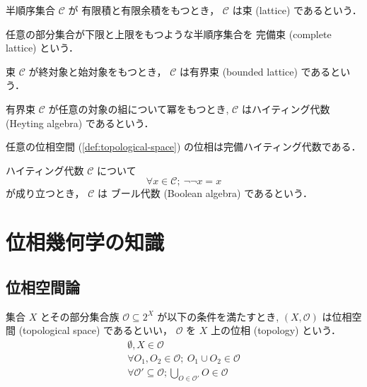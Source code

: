 \documentclass[titlepage]{ltjsreport}
\newcommand{\cat}[1]{\mathscr{#1}}
\newcommand{\objs}[1]{#1}
\begin{document}
\begin{definition}[束]
  半順序集合 $\cat{C}$ が
  有限積と有限余積をもつとき，
  $\cat{C}$ は束 (lattice) であるという．
\end{definition}

\begin{definition}[完備束]\label{def:complete-lattice}%
  任意の部分集合が下限と上限をもつような半順序集合を
  完備束
  (complete lattice)
  という．
\end{definition}

\begin{definition}[有界束]
  束 $\cat{C}$ が終対象と始対象をもつとき，
  $\cat{C}$ は有界束 (bounded lattice) であるという．
\end{definition}

\begin{definition}[ハイティング代数]\label{def:heyting-algebra}%
  有界束 $\cat{C}$ が任意の対象の組について冪をもつとき,
  $\cat{C}$ はハイティング代数 (Heyting algebra) であるという．
\end{definition}

\begin{theorem}
  任意の位相空間 (\cref{def:topological-space})
  の位相は完備ハイティング代数である．
\end{theorem}

\begin{definition}[ブール代数]\label{def:boolean-algebra}
  ハイティング代数 $\cat{C}$ について
  \begin{equation}
    \forall x\in\objs{\cat{C}};\ \neg\neg x=x
  \end{equation}
  が成り立つとき，
  $\cat{C}$ は ブール代数 (Boolean algebra) であるという．
\end{definition}

\chapter{位相幾何学の知識}

\section{位相空間論}

\begin{definition}[位相空間]\label{def:topological-space}
  集合 $X$ とその部分集合族 $\mathcal{O}\subseteq2^X$ が以下の条件を満たすとき,
  $(X,\mathcal{O})$ は位相空間 (topological space) であるといい，
  $\mathcal{O}$ を $X$ 上の位相 (topology) という．
  \begin{align}
    \emptyset,X\in\mathcal{O}                                 \\
    \forall O_1,O_2\in\mathcal{O};\ O_1\cup O_2\in\mathcal{O} \\
    \forall \mathcal{O}'\subseteq\mathcal{O};
    \bigcup_{O\in\mathcal{O}'}O\in\mathcal{O}
  \end{align}
\end{definition}
\end{document}
